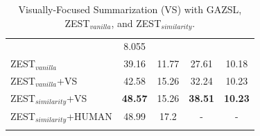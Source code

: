 \documentclass[11pt,a4paper]{article}
\begin{document}
\begin{table}[t]
{\begin{tabular}{l|cc|cc}
                & 8.055
                 \\
            ZEST$_{vanilla}$                                                                 & 39.16                            & 11.77                             & 27.61                            & 10.18                             \\
                
                 
  ZEST$_{vanilla}$+VS                             & {42.58}                                  & {15.26}                                 & {32.24}      & {10.23}        \\
ZEST$_{similarity}$+VS                             & \textbf{48.57}                                  & {15.26}                                 & \textbf{38.51}      & \textbf{10.23}        \\

ZEST$_{similarity}$+HUMAN                          & 48.99                                & 17.2                                           & -                    & -                     \\ 
\Xhline{6\arrayrulewidth}
\end{tabular}
}
    \caption{Visually-Focused Summarization (VS) with GAZSL, ZEST$_{vanilla}$, and ZEST$_{similarity}$.  }%
    \label{table:summarization}%
\end{table}





\begin{table}[t]
\centering
    \caption{Zest model with different Similarity methods }%
    \label{table:similarity}%
\end{table}
\end{document}

